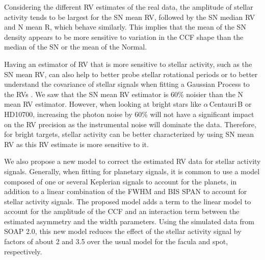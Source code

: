 \documentclass{aa}
\newcommand{\jessi}[1]{{\color{Purple}[[\textbf{Jessi: }#1]]}}
\newcommand{\xavier}[1]{{\color{blue}[[\textbf{Xavier: }#1]]}}
\newcommand{\umberto}[1]{{\color{green}[[\textbf{Umberto: }#1]]}}
\begin{document}
Considering the different RV estimates of the real data, the amplitude of stellar activity tends to be largest for the SN mean RV, followed by the SN median RV and N mean R, which behave similarly. 
This implies that the mean of the SN density appears to be more sensitive to variation in the CCF shape than the median of the SN or the mean of the Normal.  

Having an estimator of RV that is more sensitive to stellar activity, such as the SN mean RV, can also help to better probe stellar rotational periods or to better understand the covariance of stellar signals when fitting a Gaussian Process to the RVs \citep[e.g.][]{Faria-2016a, Haywood-2014}. 
We saw that the SN mean RV estimator is 60\% noisier than the N mean RV estimator. 
However, when looking at bright
stars like $\alpha$\,Centauri\,B or HD10700, increasing the photon noise by 60\% will not have a significant impact
on the RV precision as the instrumental noise will dominate the data. 
Therefore, for bright targets, stellar activity 
can be better characterized by using SN mean RV as this RV estimate is more sensitive to it.
%


We also propose a new model to correct the estimated RV data for stellar activity signals. 
Generally, when fitting for planetary signals, it is common to use a model composed of one or several Keplerian signals to account for the planets, in addition to a linear combination of the FWHM and BIS SPAN to account for stellar activity signals. 
The proposed model adds a term to the linear model to account for the amplitude of the CCF and an interaction term between the estimated asymmetry and the width parameters. 
Using the simulated data from SOAP 2.0, this new model reduces the effect of the stellar activity signal by factors of about 2 and 3.5 over the usual model for the facula and spot, respectively.
\end{document}
